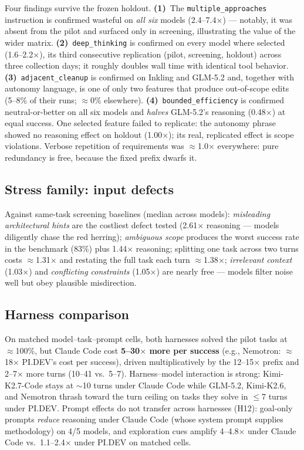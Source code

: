 \documentclass[11pt]{article}
\newcommand{\pidev}{PI.DEV}
\newcommand{\cc}{Claude Code}
\newcommand{\xd}{$\times$}
\begin{document}
Four findings survive the frozen holdout. \textbf{(1)}~The
\texttt{multiple\_approaches} instruction is confirmed wasteful on
\emph{all six} models (2.4--7.4\xd) --- notably, it was absent from the
pilot and surfaced only in screening, illustrating the value of the wider
matrix. \textbf{(2)}~\texttt{deep\_thinking} is confirmed on every model
where selected (1.6--2.2\xd), its third consecutive replication (pilot,
screening, holdout) across three collection days; it roughly doubles wall
time with identical tool behavior. \textbf{(3)}~\texttt{adjacent\_cleanup}
is confirmed on Inkling and GLM-5.2 and, together with autonomy language,
is one of only two features that produce out-of-scope edits (5--8\% of
their runs; $\approx$0\% elsewhere). \textbf{(4)}~\texttt{bounded\_efficiency}
is confirmed neutral-or-better on all six models and \emph{halves}
GLM-5.2's reasoning (0.48\xd) at equal success. One selected feature
failed to replicate: the autonomy phrase showed no reasoning effect on
holdout (1.00\xd); its real, replicated effect is scope violations.
Verbose repetition of requirements was $\approx$1.0\xd{} everywhere: pure
redundancy is free, because the fixed prefix dwarfs it.

\subsection{Stress family: input defects}

Against same-task screening baselines (median across models):
\emph{misleading architectural hints} are the costliest defect tested
(2.61\xd{} reasoning --- models diligently chase the red herring);
\emph{ambiguous scope} produces the worst success rate in the benchmark
(83\%) plus 1.44\xd{} reasoning; splitting one task across two turns costs
$\approx$1.31\xd{} and restating the full task each turn $\approx$1.38\xd;
\emph{irrelevant context} (1.03\xd) and \emph{conflicting constraints}
(1.05\xd) are nearly free --- models filter noise well but obey plausible
misdirection.

\subsection{Harness comparison}

On matched model--task--prompt cells, both harnesses solved the pilot
tasks at $\approx$100\%, but \cc{} cost \textbf{5--30\xd{} more per
success} (e.g., Nemotron: $\approx$18\xd{} \pidev's cost per success), driven multiplicatively by
the 12--15\xd{} prefix and 2--7\xd{} more turns (10--41 vs.\ 5--7).
Harness--model interaction is strong: Kimi-K2.7-Code stays at $\sim$10
turns under \cc{} while GLM-5.2, Kimi-K2.6, and Nemotron thrash toward the
turn ceiling on tasks they solve in $\leq$7 turns under \pidev.
Prompt effects do not transfer across harnesses (H12): goal-only prompts
\emph{reduce} reasoning under \cc{} (whose system prompt supplies
methodology) on 4/5 models, and exploration cues amplify 4--4.8\xd{} under
\cc{} vs.\ 1.1--2.4\xd{} under \pidev{} on matched cells.
\end{document}
